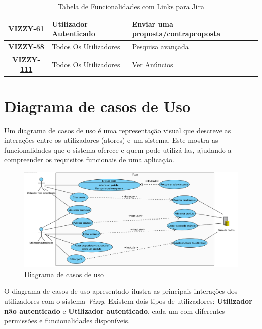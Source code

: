 \documentclass[a4paper, 12pt]{article} %
\begin{document}
\begin{table}[H]
{\begin{tabular}{|c|l|l|}
			\hline
			\href{https://basigraphics.atlassian.net/browse/VIZZY-61}{\textbf{VIZZY-61}} & Utilizador Autenticado & Enviar uma proposta/contraproposta \\			
			\hline
			\href{https://basigraphics.atlassian.net/browse/VIZZY-58}{\textbf{VIZZY-58}} & Todos Os Utilizadores & Pesquisa avançada \\
			\hline
			\href{https://basigraphics.atlassian.net/browse/VIZZY-111}{\textbf{VIZZY-111}} & Todos Os Utilizadores & Ver Anúncios \\
			\hline
		\end{tabular}%
	}
	\caption{Tabela de Funcionalidades com Links para Jira}
	\label{tab:funcionalidades_jira}
\end{table}

\newpage
\section{Diagrama de casos de Uso}

Um diagrama de casos de uso é uma representação visual que descreve as interações entre os utilizadores (atores) e um sistema. Este mostra as funcionalidades que o sistema oferece e quem pode utilizá-las, ajudando a compreender os requisitos funcionais de uma aplicação.


\begin{figure}[ht]
	\centering
	\includegraphics[width=\textwidth]{../images/use-case-diagram.png}
	\caption{Diagrama de casos de uso}
	\label{fig:casos de uso}
\end{figure}

O diagrama de casos de uso apresentado ilustra as principais interações dos utilizadores com o sistema \textit{Vizzy}. Existem dois tipos de utilizadores: \textbf{Utilizador não autenticado} e \textbf{Utilizador autenticado}, cada um com diferentes permissões e funcionalidades disponíveis.
\end{document}
